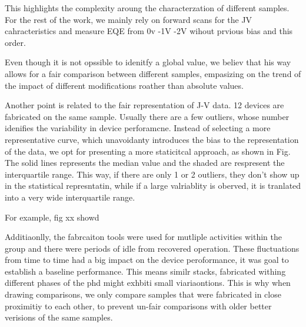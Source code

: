 This highlights the complexity aroung the characterzation of different samples. For the rest of the work, we mainly rely on forward scans for the JV cahracteristics and measure EQE from 0v -1V -2V wihout prvious bias and this order. 

Even though it is not opssible to idenitfy a global value, we believ that his way allows for a fair comparison between different samples, empasizing on the trend of the impact of different modifications roather than absolute values.

Another point is related to the fair representation of J-V data. 12 devices are fabricated on the same sample. Usually there are a few outliers, whose number idenifies the variability in device perforamcne. Instead of selecting a more representative curve, which unavoidanty introduces the bias to the representation of the data, we opt for presenting a more staticitcal approach, as shown in Fig. The solid lines represents the median value and the shaded are respresent the interquartile range. This way, if there are only 1 or 2 outliers, they don't show up in the statistical represntatin, while if a large valriablity is oberved, it is tranlated into a very wide interquartile range.  

For example, fig xx showd

Additiaonlly, the fabrcaiton tools were used for mutliple activities within the group and there were periods of idle from recovered operation. These fluctuations from time to time had a big impact on the device peroformance, it was goal to establish a baseline performance. This means similr stacks, fabricated withing different phases of the phd might exhbiti small viariaontions. This is why when drawing comparisons, we only compare samples that were fabricated in close proximitiy to each other, to prevent un-fair comparisons with older better verisions of the same samples. 

